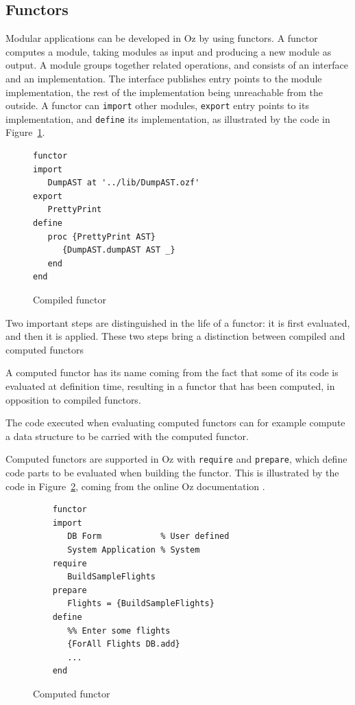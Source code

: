 \documentclass[a4paper]{memoir}
\begin{document}
\subsection{Functors}\label{sec:input:functors}
Modular applications can be developed in Oz by using functors. A functor
computes a module, taking modules as input and producing a new module as output.
A module groups together related operations, and consists of an interface and an implementation.
The interface publishes entry points to the module implementation, the rest of
the implementation being unreachable from the outside.
A functor can \lstinline!import! other modules, \lstinline!export! entry points to
its implementation, and \lstinline!define! its implementation, as illustrated by
the code in Figure~\ref{fig:compiled_functor}.
\begin{figure}[h]
\begin{lstlisting}
functor
import
   DumpAST at '../lib/DumpAST.ozf'
export
   PrettyPrint
define
   proc {PrettyPrint AST}
      {DumpAST.dumpAST AST _}
   end
end
\end{lstlisting}
\caption{Compiled functor}
\label{fig:compiled_functor}
\end{figure}

Two important steps are distinguished in the life of a functor: it is first
evaluated, and then it is applied.
These two steps bring a distinction between compiled and computed functors
\cite{Func}

A computed functor has its name coming from the fact that some of its code is evaluated
at definition time, resulting in a functor that has been computed, in opposition to
compiled functors.

The code executed when evaluating computed functors can for example compute a
data structure to be carried with the computed functor.


Computed functors are supported in Oz with
\lstinline!require! and \lstinline!prepare!, which define code parts to be evaluated when
building the functor. This is illustrated by the code in
Figure~\ref{fig:computed_functor}, coming from the online Oz
documentation \cite{Func}.

\begin{figure}[h]
\begin{lstlisting}
    functor 
    import 
       DB Form            % User defined
       System Application % System
    require
       BuildSampleFlights
    prepare 
       Flights = {BuildSampleFlights}
    define 
       %% Enter some flights
       {ForAll Flights DB.add}
       ... 
    end
\end{lstlisting}
\caption{Computed functor}
\label{fig:computed_functor}
\end{figure}
\end{document}
